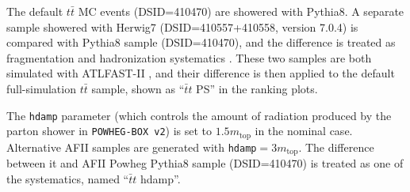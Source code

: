 The default $t\bar{t}$ MC events (DSID=410470) are showered with Pythia8. A separate sample showered with Herwig7 (DSID=410557+410558, version 7.0.4) is compared with Pythia8 sample (DSID=410470), and the difference is treated as fragmentation and hadronization systematics \cite{ttbarSys}. These two samples are both simulated with ATLFAST-II \cite{AFII}, and their difference is then applied to the default full-simulation $t\bar{t}$ sample, shown as ``$\bar{t}t$ PS'' in the ranking plots.


The \texttt{hdamp} parameter (which controls the amount of radiation produced by the parton shower in \texttt{POWHEG-BOX v2}) is set to $1.5 m_{\text{top}}$ in the nominal case. Alternative AFII samples are generated with \texttt{hdamp}$=3 m_{\text{top}}$. The difference between it and AFII Powheg Pythia8 sample (DSID=410470) is treated as one of the systematics, named ``$\bar{t}t$ hdamp''.


